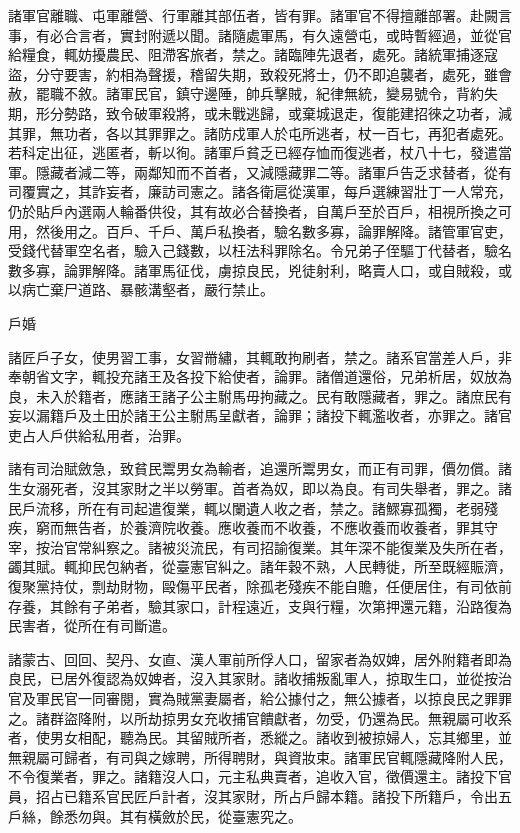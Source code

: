 \begin{pinyinscope}
 諸軍官離職、屯軍離營、行軍離其部伍者，皆有罪。諸軍官不得擅離部署。赴闕言事，有必合言者，實封附遞以聞。諸隨處軍馬，有久遠營屯，或時暫經過，並從官給糧食，輒妨擾農民、阻滯客旅者，禁之。諸臨陣先退者，處死。諸統軍捕逐寇盜，分守要害，約相為聲援，稽留失期，致殺死將士，仍不即追襲者，處死，雖會赦，罷職不敘。諸軍民官，鎮守邊陲，帥兵擊賊，紀律無統，變易號令，背約失期，形分勢路，致令破軍殺將，或未戰逃歸，或棄城退走，復能建招徠之功者，減其罪，無功者，各以其罪罪之。諸防戍軍人於屯所逃者，杖一百七，再犯者處死。若科定出征，逃匿者，斬以徇。諸軍戶貧乏已經存恤而復逃者，杖八十七，發遣當軍。隱藏者減二等，兩鄰知而不首者，又減隱藏罪二等。諸軍戶告乏求替者，從有司覆實之，其詐妄者，廉訪司憲之。諸各衛扈從漢軍，每戶選練習壯丁一人常充，仍於貼戶內選兩人輪番供役，其有故必合替換者，自萬戶至於百戶，相視所換之可用，然後用之。百戶、千戶、萬戶私換者，驗名數多寡，論罪解降。諸管軍官吏，受錢代替軍空名者，驗入己錢數，以枉法科罪除名。令兄弟子侄驅丁代替者，驗名數多寡，論罪解降。諸軍馬征伐，虜掠良民，兇徒射利，略賣人口，或自賊殺，或以病亡棄尸道路、暴骸溝壑者，嚴行禁止。



 戶婚



 諸匠戶子女，使男習工事，女習黹繡，其輒敢拘刷者，禁之。諸系官當差人戶，非奉朝省文字，輒投充諸王及各投下給使者，論罪。諸僧道還俗，兄弟析居，奴放為良，未入於籍者，應諸王諸子公主駙馬毋拘藏之。民有敢隱藏者，罪之。諸庶民有妄以漏籍戶及土田於諸王公主駙馬呈獻者，論罪；諸投下輒濫收者，亦罪之。諸官吏占人戶供給私用者，治罪。



 諸有司治賦斂急，致貧民鬻男女為輸者，追還所鬻男女，而正有司罪，價勿償。諸生女溺死者，沒其家財之半以勞軍。首者為奴，即以為良。有司失舉者，罪之。諸民戶流移，所在有司起遣復業，輒以闌遺人收之者，禁之。諸鰥寡孤獨，老弱殘疾，窮而無告者，於養濟院收養。應收養而不收養，不應收養而收養者，罪其守宰，按治官常糾察之。諸被災流民，有司招諭復業。其年深不能復業及失所在者，蠲其賦。輒抑民包納者，從臺憲官糾之。諸年穀不熟，人民轉徙，所至既經賑濟，復聚黨持仗，剽劫財物，毆傷平民者，除孤老殘疾不能自贍，任便居住，有司依前存養，其餘有子弟者，驗其家口，計程遠近，支與行糧，次第押還元籍，沿路復為民害者，從所在有司斷遣。



 諸蒙古、回回、契丹、女直、漢人軍前所俘人口，留家者為奴婢，居外附籍者即為良民，已居外復認為奴婢者，沒入其家財。諸收捕叛亂軍人，掠取生口，並從按治官及軍民官一同審閱，實為賊黨妻屬者，給公據付之，無公據者，以掠良民之罪罪之。諸群盜降附，以所劫掠男女充收捕官饋獻者，勿受，仍還為民。無親屬可收系者，使男女相配，聽為民。其留賊所者，悉縱之。諸收到被掠婦人，忘其鄉里，並無親屬可歸者，有司與之嫁聘，所得聘財，與資妝束。諸軍民官輒隱藏降附人民，不令復業者，罪之。諸籍沒人口，元主私典賣者，追收入官，徵價還主。諸投下官員，招占已籍系官民匠戶計者，沒其家財，所占戶歸本籍。諸投下所籍戶，令出五戶絲，餘悉勿與。其有橫斂於民，從臺憲究之。




\end{pinyinscope}
